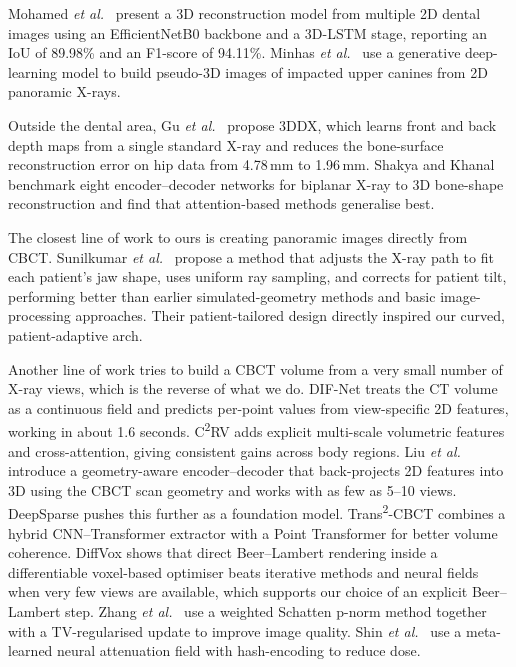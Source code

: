 \documentclass[conference]{IEEEtran}
\begin{document}
Mohamed \emph{et al.}\ \cite{mohamed20253d} present a 3D reconstruction model from multiple 2D dental images using an EfficientNetB0 backbone and a 3D-LSTM stage, reporting an IoU of 89.98\% and an F1-score of 94.11\%. Minhas \emph{et al.}\ \cite{minhas2024artificial} use a generative deep-learning model to build pseudo-3D images of impacted upper canines from 2D panoramic X-rays.

Outside the dental area, Gu \emph{et al.}\ \cite{gu20243ddx} propose 3DDX, which learns front and back depth maps from a single standard X-ray and reduces the bone-surface reconstruction error on hip data from 4.78\,mm to 1.96\,mm. Shakya and Khanal \cite{shakya2023benchmarking} benchmark eight encoder--decoder networks for biplanar X-ray to 3D bone-shape reconstruction and find that attention-based methods generalise best.

The closest line of work to ours is creating panoramic images directly from CBCT. Sunilkumar \emph{et al.}\ \cite{sunilkumar2025panoramic} propose a method that adjusts the X-ray path to fit each patient's jaw shape, uses uniform ray sampling, and corrects for patient tilt, performing better than earlier simulated-geometry methods and basic image-processing approaches. Their patient-tailored design directly inspired our curved, patient-adaptive arch.

Another line of work tries to build a CBCT volume from a very small number of X-ray views, which is the reverse of what we do. DIF-Net \cite{lin2023learning} treats the CT volume as a continuous field and predicts per-point values from view-specific 2D features, working in about 1.6 seconds. C\textsuperscript{2}RV \cite{lin2024c} adds explicit multi-scale volumetric features and cross-attention, giving consistent gains across body regions. Liu \emph{et al.}\ \cite{liu2024geometry} introduce a geometry-aware encoder--decoder that back-projects 2D features into 3D using the CBCT scan geometry and works with as few as 5--10 views. DeepSparse \cite{lin2026deepsparse} pushes this further as a foundation model. Trans\textsuperscript{2}-CBCT \cite{yang2025trans} combines a hybrid CNN--Transformer extractor with a Point Transformer for better volume coherence. DiffVox \cite{momeni2024differentiable} shows that direct Beer--Lambert rendering inside a differentiable voxel-based optimiser beats iterative methods and neural fields when very few views are available, which supports our choice of an explicit Beer--Lambert step. Zhang \emph{et al.}\ \cite{zhang2023novel} use a weighted Schatten p-norm method together with a TV-regularised update to improve image quality. Shin \emph{et al.}\ \cite{shin2025sparse} use a meta-learned neural attenuation field with hash-encoding to reduce dose.
\end{document}
